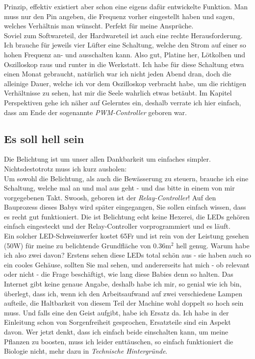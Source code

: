 \documentclass[12pt,titlepage,a4paper]{article}
\begin{document}
Prinzip, effektiv existiert aber schon eine eigens dafür entwickelte Funktion. Man muss nur den Pin angeben, die Frequenz vorher eingestellt haben und sagen, welches Verhältnis man wünscht. Perfekt für meine Ansprüche. \\
Soviel zum Softwareteil, der Hardwareteil ist auch eine rechte Herausforderung. Ich brauche für jeweils vier Lüfter eine Schaltung, welche den Strom auf einer so hohen Frequenz an- und ausschalten kann. Also gut, Platine her, Lötkolben und Oszilloskop raus und runter in die Werkstatt. Ich habe für diese Schaltung etwa einen Monat gebraucht, natürlich war ich nicht jeden Abend dran, doch die alleinige Dauer, welche ich vor dem Oszilloskop verbracht habe, um die richtigen Verhältnisse zu sehen, hat mir die Seele wahrlich etwas betäubt. Im Kapitel Perspektiven gehe ich näher auf Gelerntes ein, deshalb verrate ich hier einfach, dass am Ende der sogenannte \textit{PWM-Controller} geboren war.



\subsection{Es soll hell sein}
Die Belichtung ist um unser allen Dankbarkeit um einfaches simpler. Nichtsdestotrotz muss ich kurz ausholen:\\ Um sowohl die Belichtung, als auch die Bewässerung zu steuern, brauche ich eine Schaltung, welche mal an und mal aus geht - und das bitte in einem von mir vorgegebenen Takt. Swoosh, geboren ist der \textit{Relay-Controller}! Auf den Bauprozess dieses Babys wird später eingegangen, Sie sollen einfach wissen, dass es recht gut funktioniert. Die ist Belichtung echt keine Hexerei, die LEDs gehören einfach eingesteckt und der Relay-Controller vorprogrammiert und es läuft. \\ Ein solcher LED-Schweinwerfer kostet 65Fr und ist rein von der Leistung gesehen (50W) für meine zu belichtende Grundfläche von 0.36m$^{2}$ hell genug. Warum habe ich also zwei davon? Erstens sehen diese LEDs total schön aus - sie haben auch so ein cooles Gehäuse, sollten Sie mal sehen, und andererseits hat mich - ob relevant oder nicht - die Frage beschäftigt, wie lang diese Babies denn so halten. Das Internet gibt keine genaue Angabe, deshalb habe ich mir, so genial wie ich bin, überlegt, dass ich, wenn ich den Arbeitsaufwand auf zwei verschiedene Lampen aufteile, die Haltbarkeit von diesem Teil der Machine wohl doppelt so hoch sein muss. Und falls eine den Geist aufgibt, habe ich Ersatz da. Ich habe in der Einleitung schon von Sorgenfreiheit gesprochen, Ersatzteile sind ein Aspekt davon. Wer jetzt denkt, dass ich einfach beide einschalten kann, um meine Pflanzen zu boosten, muss ich leider enttäuschen, so einfach funktioniert die Biologie nicht, mehr dazu in \textit{Technische Hintergründe}.
\end{document}
